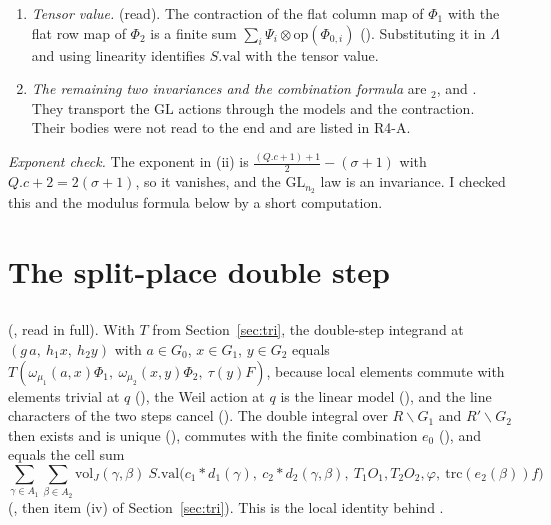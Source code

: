 \documentclass[11pt]{article}
\newcommand{\GL}{\mathrm{GL}}
\begin{document}
\begin{enumerate}[leftmargin=*,itemsep=3pt]
\item \emph{Tensor value.}  (read). The contraction of the flat column map of $\Phi_1$ with the flat row map of $\Phi_2$ is a finite sum $\sum_i\Psi_i\otimes\mathrm{op}(\Phi_{0,i})$ (). Substituting it in $\Lambda$ and using linearity identifies $S.\mathrm{val}$ with the tensor value.
\item \emph{The remaining two invariances and the combination formula} are $_2$,  and . They transport the $\GL$ actions through the models and the contraction. Their bodies were not read to the end and are listed in R4-A.
\end{enumerate}

\emph{Exponent check.} The exponent in (ii) is $\frac{(Q.c+1)+1}{2}-(\sigma+1)$ with $Q.c+2=2(\sigma+1)$, so it vanishes, and the $\GL_{n_2}$ law is an invariance. I checked this and the modulus formula below by a short computation.

\section{The split-place double step}\label{sec:split}

\subsection{}

 (, read in full). With $T$ from Section~\ref{sec:tri}, the double-step integrand at $(g\,a,\ h_1x,\ h_2y)$ with $a\in G_0$, $x\in G_1$, $y\in G_2$ equals $T(\omega_{\mu_1}(a,x)\Phi_1,\ \omega_{\mu_2}(x,y)\Phi_2,\ \tau(y)F)$, because local elements commute with elements trivial at $q$ (), the Weil action at $q$ is the linear model (), and the line characters of the two steps cancel (). The double integral over $R\backslash G_1$ and $R'\backslash G_2$ then exists and is unique (), commutes with the finite combination $e_0$ (), and equals the cell sum
\[
\sum_{\gamma\in A_1}\sum_{\beta\in A_2}\mathrm{vol}_J(\gamma,\beta)\ S.\mathrm{val}\bigl(c_1*d_1(\gamma),\ c_2*d_2(\gamma,\beta),\ T_1O_1,T_2O_2,\varphi,\ \mathrm{trc}(e_2(\beta))f\bigr)
\]
(, then item (iv) of Section~\ref{sec:tri}). This is the local identity behind .
\end{document}
